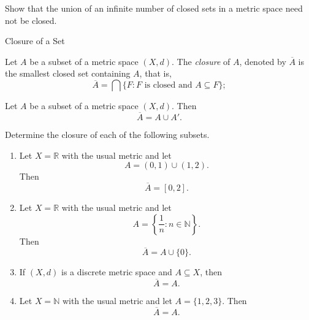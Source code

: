\documentclass[12pt, a4paper]{article}
\begin{document}
\clearpage

\begin{problem}
Show that the union of an infinite number of closed sets in a metric space need not be
closed.
\end{problem}

\clearpage

\begin{heading}
    Closure of a Set
\end{heading}

\vspace{10pt}

\begin{definition}[Closure]
    Let $A$ be a subset of a metric space $(X,d)$. The \emph{closure} of $A$, denoted by $\overline{A}$ is the smallest closed set containing $A$, that is,
    \[
    \overline{A}=\bigcap\{F : F \text{ is closed and } A\subseteq F\};
    \]
    
\end{definition}

\clearpage

\begin{theorem}
Let $A$ be a subset of a metric space $(X,d)$. Then
\[
\overline{A}=A\cup A'.
\]
\end{theorem}

\clearpage

\begin{problem}
Determine the closure of each of the following subsets.
\begin{enumerate}
    \item Let $X=\mathbb{R}$ with the usual metric and let
    \[
    A=(0,1)\cup(1,2).
    \]
    Then
    \[
    \overline{A}=[0,2].
    \]

    \item Let $X=\mathbb{R}$ with the usual metric and let
    \[
    A=\left\{\frac{1}{n} : n\in\mathbb{N}\right\}.
    \]
    Then
    \[
    \overline{A}=A\cup\{0\}.
    \]

    \item If $(X,d)$ is a discrete metric space and $A\subseteq X$, then
    \[
    \overline{A}=A.
    \]

    \item Let $X=\mathbb{N}$ with the usual metric and let $A=\{1,2,3\}$. Then
    \[
    \overline{A}=A.
    \]
\end{enumerate}
\end{problem}
\end{document}
